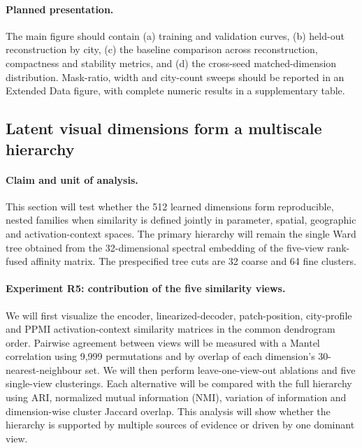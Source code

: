\paragraph{Planned presentation.}
The main figure should contain (a) training and validation curves, (b) held-out
reconstruction by city, (c) the baseline comparison across reconstruction,
compactness and stability metrics, and (d) the cross-seed matched-dimension
distribution. Mask-ratio, width and city-count sweeps should be reported in an
Extended Data figure, with complete numeric results in a supplementary table.

\subsection{Latent visual dimensions form a multiscale hierarchy}
\label{sec:results_hierarchy}

\paragraph{Claim and unit of analysis.}
This section will test whether the 512 learned dimensions form reproducible,
nested families when similarity is defined jointly in parameter, spatial,
geographic and activation-context spaces. The primary hierarchy will remain the
single Ward tree obtained from the 32-dimensional spectral embedding of the
five-view rank-fused affinity matrix. The prespecified tree cuts are 32 coarse
and 64 fine clusters.

\paragraph{Experiment R5: contribution of the five similarity views.}
We will first visualize the encoder, linearized-decoder, patch-position,
city-profile and PPMI activation-context similarity matrices in the common
dendrogram order. Pairwise agreement between views will be measured with a
Mantel correlation using 9,999 permutations and by overlap of each dimension's
30-nearest-neighbour set. We will then perform leave-one-view-out ablations and
five single-view clusterings. Each alternative will be compared with the full
hierarchy using ARI, normalized mutual information (NMI), variation of
information and dimension-wise cluster Jaccard overlap. This analysis will show
whether the hierarchy is supported by multiple sources of evidence or driven by
one dominant view.

